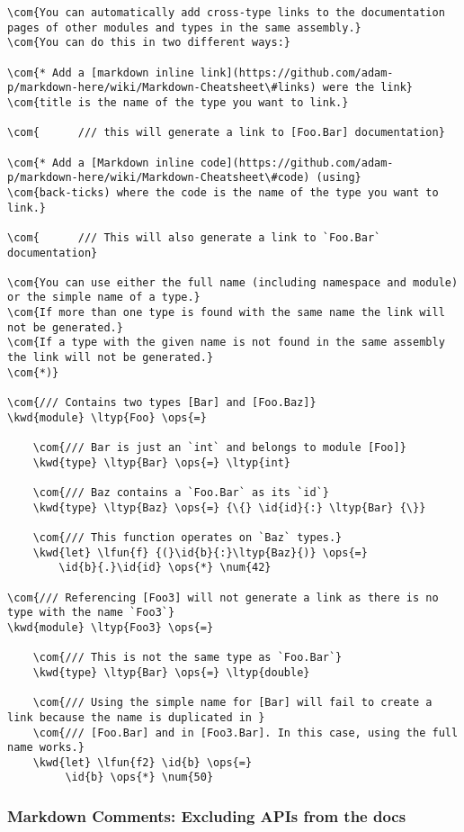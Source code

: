 \documentclass{article}
\newcommand{\id}[1]{\textcolor{black}{#1}}
\newcommand{\com}[1]{\textcolor{officegreen}{#1}}
\newcommand{\kwd}[1]{\textcolor{navy}{#1}}
\newcommand{\num}[1]{\textcolor{officegreen}{#1}}
\newcommand{\ops}[1]{\textcolor{purple}{#1}}
\begin{document}
\begin{Verbatim}[commandchars=\\\{\}]
\com{You can automatically add cross-type links to the documentation pages of other modules and types in the same assembly.}
\com{You can do this in two different ways:}

\com{* Add a [markdown inline link](https://github.com/adam-p/markdown-here/wiki/Markdown-Cheatsheet\#links) were the link}
\com{title is the name of the type you want to link.}

\com{      /// this will generate a link to [Foo.Bar] documentation}

\com{* Add a [Markdown inline code](https://github.com/adam-p/markdown-here/wiki/Markdown-Cheatsheet\#code) (using}
\com{back-ticks) where the code is the name of the type you want to link.}

\com{      /// This will also generate a link to `Foo.Bar` documentation}

\com{You can use either the full name (including namespace and module) or the simple name of a type.}
\com{If more than one type is found with the same name the link will not be generated.}
\com{If a type with the given name is not found in the same assembly the link will not be generated.}
\com{*)}

\com{/// Contains two types [Bar] and [Foo.Baz]}
\kwd{module} \ltyp{Foo} \ops{=} 
    
    \com{/// Bar is just an `int` and belongs to module [Foo]}
    \kwd{type} \ltyp{Bar} \ops{=} \ltyp{int}
    
    \com{/// Baz contains a `Foo.Bar` as its `id`}
    \kwd{type} \ltyp{Baz} \ops{=} {\{} \id{id}{:} \ltyp{Bar} {\}}

    \com{/// This function operates on `Baz` types.}
    \kwd{let} \lfun{f} {(}\id{b}{:}\ltyp{Baz}{)} \ops{=} 
        \id{b}{.}\id{id} \ops{*} \num{42}

\com{/// Referencing [Foo3] will not generate a link as there is no type with the name `Foo3`}
\kwd{module} \ltyp{Foo3} \ops{=}
    
    \com{/// This is not the same type as `Foo.Bar`}
    \kwd{type} \ltyp{Bar} \ops{=} \ltyp{double}

    \com{/// Using the simple name for [Bar] will fail to create a link because the name is duplicated in }
    \com{/// [Foo.Bar] and in [Foo3.Bar]. In this case, using the full name works.}
    \kwd{let} \lfun{f2} \id{b} \ops{=}
         \id{b} \ops{*} \num{50}
\end{Verbatim}

\subsubsection*{Markdown Comments: Excluding APIs from the docs}
\end{document}
